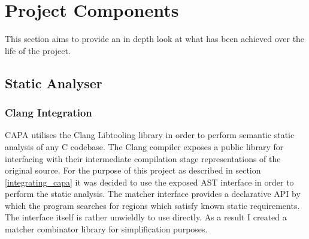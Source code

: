 
\section{Project Components}

This section aims to provide an in depth look at what has been achieved over the life of the
project.

\subsection{Static Analyser}

\subsubsection{Clang Integration}
CAPA utilises the Clang Libtooling library in order to perform semantic static analysis of any C
codebase. The Clang compiler exposes a public library for interfacing with their intermediate
compilation stage representations of the original source. For the purpose of this project as
described in section \ref{integrating_capa} it was decided to use the exposed AST interface in order
to perform the static analysis. The matcher interface provides a declarative API by which the
program searches for regions which satisfy known static requirements. The interface itself is rather
unwieldly to use directly.   As a result I created a matcher
combinator library for simplification purposes.

